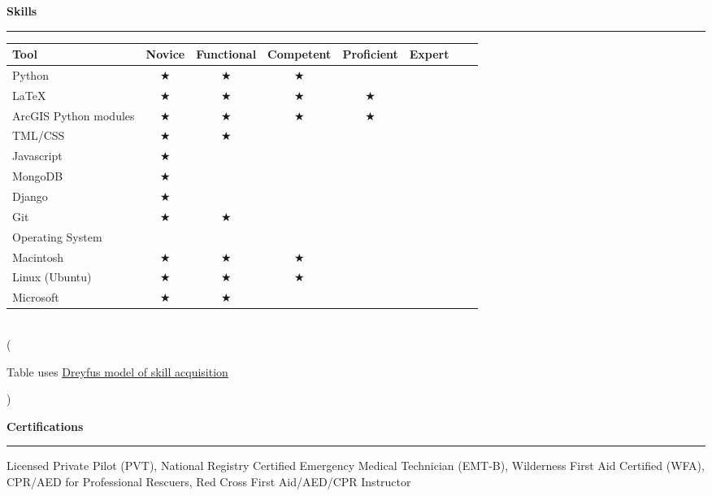 \documentclass[11pt]{article}
\begin{document}
\smallskip
\vspace*{0.25 mm}
\textbf{Skills}
\smallskip
\hrule

\begin{table}[h]
\begin{center}
\begin{tabular}{l*{6}{c}r}
\hline
Tool      & Novice & Functional & Competent & Proficient & Expert \\
\hline
Python & $\bigstar$ & $\bigstar$ & $\bigstar$ &  &   \\
\LaTeX            & $\bigstar$ & $\bigstar$ & $\bigstar$ & $\bigstar$ &   \\
ArcGIS Python modules           & $\bigstar$ & $\bigstar$ & $\bigstar$ & $\bigstar$ &   \\
TML/CSS     & $\bigstar$ & $\bigstar$ &  &  &   \\
Javascript     & $\bigstar$ &  &  &  &   \\
MongoDB     & $\bigstar$ &  &  &  &   \\
Django     & $\bigstar$ &  &  &  &   \\
Git     & $\bigstar$ & $\bigstar$ &  &  &    \\ 
\hline
Operating System       \\
\hline
Macintosh & $\bigstar$ & $\bigstar$ & $\bigstar$ &  &  \\
Linux (Ubuntu)            & $\bigstar$ & $\bigstar$ & $\bigstar$ &  &   \\
Microsoft           & $\bigstar$ & $\bigstar$ &  &  &   \\
\end{tabular} \\
(\begin{small}Table uses \href{https://en.wikipedia.org/wiki/Dreyfus\_model\_of\_skill\_acquisition\#The\_original\_five-stage\_model}{Dreyfus model of skill acquisition}\end{small})
\end{center}
\end{table}  



\vspace*{0.25 mm}
\textbf{Certifications}
\smallskip
\hrule  
Licensed Private Pilot (PVT), National Registry Certified Emergency Medical Technician (EMT-B), Wilderness First Aid Certified (WFA), CPR/AED for Professional Rescuers, Red Cross First Aid/AED/CPR Instructor%

\end{document}
